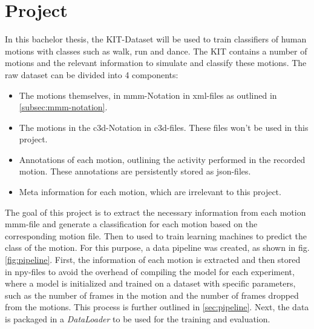 \chapter{Project}\label{chap:project}
	In this bachelor thesis, the KIT-Dataset\cite{Plappert2016} will be used to train classifiers of human motions with classes such as walk, run and dance. The KIT contains a number of motions and the relevant information to simulate and classify these motions. The raw dataset can be divided into 4 components:
	\begin{itemize}
		\item The motions themselves, in mmm-Notation in xml-files as outlined in \ref{subsec:mmm-notation}.
		\item The motions in the c3d-Notation in c3d-files. These files won't be used in this project.
		\item Annotations of each motion, outlining the activity performed in the recorded motion. These annotations are persistently stored as json-files.
		\item Meta information for each motion, which are irrelevant to this project.
	\end{itemize}
	The goal of this project is to extract the necessary information from each motion mmm-file and generate a classification for each motion based on the corresponding motion file. Then to used to train learning machines to predict the class of the motion. For this purpose, a data pipeline was created, as shown in fig. \ref{fig:pipeline}. First, the information of each motion is extracted and then stored in npy-files to avoid the overhead of compiling the model for each experiment, where a model is initialized and trained on a dataset with specific parameters, such as the number of frames in the motion and the number of frames dropped from the motions. This process is further outlined in \ref{sec:pipeline}. Next, the data is packaged in a \textit{DataLoader} to be used for the training and evaluation.
